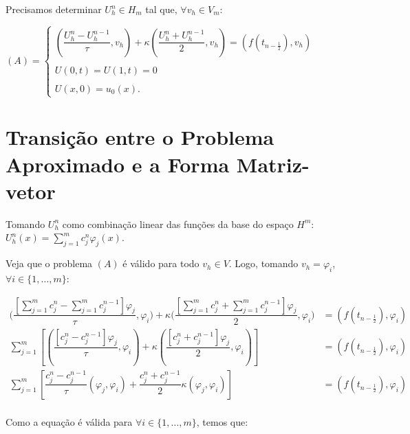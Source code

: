   Precisamos determinar $U_h^n \in H_m$ tal que, $\forall v_h \in V_m$:

  \begin{center}
    $ (A) = \begin{cases}
      \left(\dfrac{U_h^n - U_h^{n-1}}{\tau}, v_h\right) + \kappa\left(\dfrac{U_h^n + U_h^{n-1}}{2}, v_h\right) = (f(t_{n - \frac{1}{2}}), v_h) \\ \\
      U(0,t) = U(1,t) = 0 \\ \\
      U(x,0) = u_0(x).
    \end{cases}$
  \end{center}

\section{Transição entre o Problema Aproximado e a Forma Matriz-vetor}

  Tomando $U_h^n$ como combinação linear das funções da base do espaço $H^m$: $U_h^n(x) = \sum_{j=1}^{m} c_j^n \varphi_j(x)$.

  Veja que o problema $(A)$ é válido para todo $v_h \in V$. Logo, tomando $v_h = \varphi_i$, $\forall i \in \{1,\dots,m\}$:

\begin{align*}
  \Biggl(\dfrac{\left[\displaystyle\sum_{j=1}^{m} c_j^n - \displaystyle\sum_{j=1}^{m} c_j^{n-1}\right]\varphi_j}{\tau}, \varphi_i\Biggr) + \kappa\Biggl(\dfrac{\left[\displaystyle\sum_{j=1}^{m} c_j^n + \displaystyle\sum_{j=1}^{m} c_j^{n-1}\right]\varphi_j}{2}, \varphi_i\Biggr) &= (f(t_{n - \frac{1}{2}}), \varphi_i)\\
  \sum_{j=1}^{m}\left[ \left( \dfrac{[c_j^n - c_j^{n-1}] \varphi_j}{\tau}, \varphi_i\right) + \kappa\left( \dfrac{[c_j^n + c_j^{n-1}] \varphi_j}{2}, \varphi_i\right)\right] &= (f(t_{n - \frac{1}{2}}), \varphi_i)\\
  \sum_{j=1}^{m}\left[ \dfrac{c_j^n - c_j^{n-1}}{\tau} (\varphi_j, \varphi_i) + \dfrac{c_j^n + c_j^{n-1}}{2} \kappa(\varphi_j, \varphi_i) \right] &= (f(t_{n - \frac{1}{2}}), \varphi_i)\\
\end{align*}

  Como a equação é válida para $\forall i \in \{1,\dots,m\}$, temos que:

